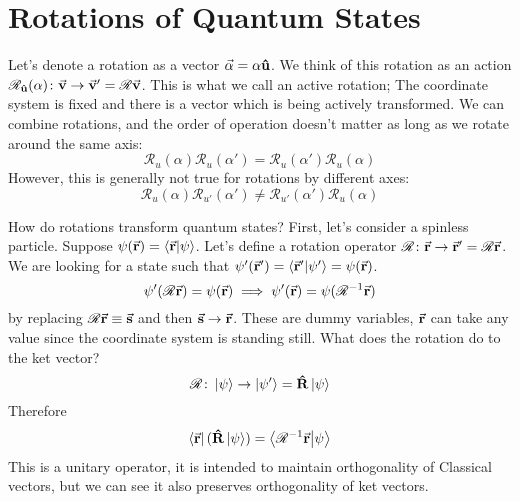 \documentclass[a4paper,twoside,master.tex]{subfiles}
\begin{document}

\section{Rotations of Quantum States}
\label{sec:rotations_of_quantum_states}

Let's denote a rotation as a vector $ \va{\alpha} = \alpha \vu{u} $. We think of this rotation as an action $ \mathscr{R}_{ \vu{u}}(\alpha)\colon \va{v} \to \va{v}' = \mathscr{R} \va{v} $. This is what we call an active rotation; The coordinate system is fixed and there is a vector which is being actively transformed. We can combine rotations, and the order of operation doesn't matter as long as we rotate around the same axis:
\begin{equation}
    \mathscr{R}_u(\alpha) \mathscr{R}_u(\alpha') = \mathscr{R}_u(\alpha') \mathscr{R}_u(\alpha)
\end{equation}
However, this is generally not true for rotations by different axes:
\begin{equation}
    \mathscr{R}_u(\alpha) \mathscr{R}_{u'}(\alpha') \neq \mathscr{R}_{u'}(\alpha') \mathscr{R}_u(\alpha)
\end{equation}

How do rotations transform quantum states? First, let's consider a spinless particle. Suppose $ \psi( \va{r}) =\bra{ \va{r}}\ket{\psi} $. Let's define a rotation operator $ \mathscr{R}\colon \va{r} \to \va{r}' = \mathscr{R} \va{r} $. We are looking for a state such that $ \psi'( \va{r}') =\bra{ \va{r}'}\ket{\psi'} = \psi( \va{r}) $.
\begin{equation}
    \psi'( \mathscr{R} \va{r}) = \psi( \va{r}) \implies \psi'( \va{r}) = \psi( \mathscr{R}^{-1} \va{r})
\end{equation}
by replacing $ \mathscr{R} \va{r} \equiv \va{s} $ and then $ \va{s} \to \va{r} $. These are dummy variables, $ \va{r} $ can take any value since the coordinate system is standing still. What does the rotation do to the ket vector?
\begin{equation}
    \mathscr{R}\colon\ket{\psi} \to\ket{\psi'} = \vu{R}\ket{\psi}
\end{equation}
Therefore
\begin{equation}
    \bra{ \va{r}}( \vu{R}\ket{\psi}) =\bra{\mathscr{R}^{-1} \va{r}}\ket{\psi}
\end{equation}
This is a unitary operator, it is intended to maintain orthogonality of Classical vectors, but we can see it also preserves orthogonality of ket vectors.
\end{document}
